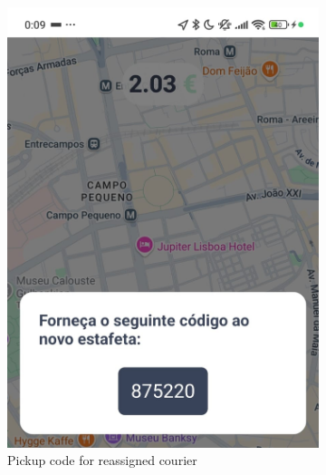 \begin{figure}[H]
    \begin{subfigure}[b]{0.47\textwidth}
        \centering
        \includegraphics[width=\textwidth]{images/CodeReassignment.jpeg}
        \caption{Pickup code for reassigned courier}
        \label{fig:code_reassignment}
    \end{subfigure}
    \hfill
    \begin{subfigure}[b]{0.47\textwidth}
        \centering

\end{subfigure}
\end{figure}
